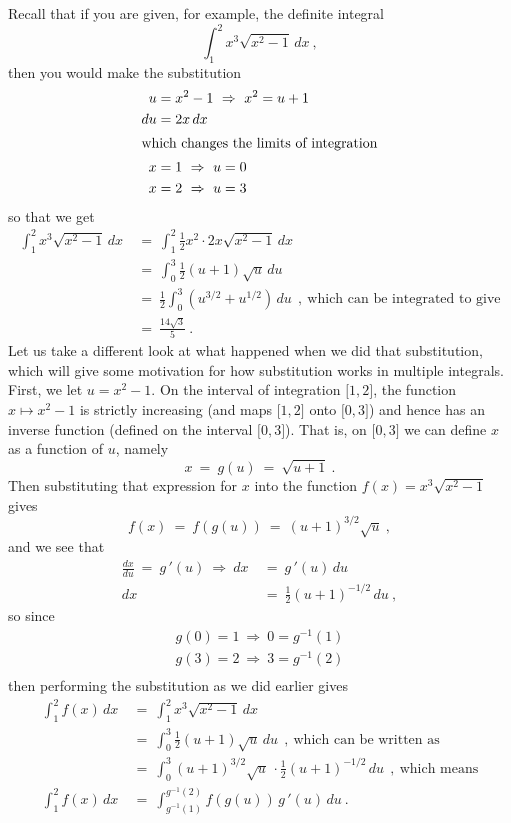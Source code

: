 Recall that if you are given, for example, the definite integral
\begin{displaymath}
 \int_1^2 x^3 \sqrt{x^2 - 1}\,dx ~,
\end{displaymath}
then you would make the substitution
\begin{align*}
u &= x^2 - 1 ~\Rightarrow~ x^2 = u + 1\\
du &= 2x\,dx\\
\intertext{which changes the limits of integration}
x &= 1 ~\Rightarrow~ u = 0\\
x &= 2 ~\Rightarrow~ u = 3
\end{align*}
so that we get
\begin{align*}
 \int_1^2 x^3 \sqrt{x^2 - 1}\,dx ~&=~ \int_1^2 \tfrac{1}{2}x^2 \cdot 2x \sqrt{x^2 - 1}\,dx\\
 &=~ \int_0^3 \tfrac{1}{2}(u+1)\sqrt{u}\,du\\
 &=~ \tfrac{1}{2} \int_0^3 \left( u^{3/2} + u^{1/2} \right)\,du ~~,~\text{which can be integrated to give}\\
 &=~ \tfrac{14\sqrt{3}}{5} ~.
\end{align*}
Let us take a different look at what happened when we did that substitution, which will give some motivation for how
substitution works in multiple integrals. First, we let $u = x^2 - 1$. On the interval of integration
$\lbrack 1,2 \rbrack$, the function $x \mapsto x^2 - 1$ is strictly increasing (and maps $\lbrack 1,2 \rbrack$ onto
$\lbrack 0,3 \rbrack$) and hence has an inverse function (defined on the interval $\lbrack 0,3 \rbrack$). That
is, on $\lbrack 0,3 \rbrack$ we can define $x$ as a function of $u$, namely
\begin{displaymath}
 x ~=~ g(u) ~=~ \sqrt{u+1} ~.
\end{displaymath}
Then substituting that expression for $x$ into the function $f(x) = x^3 \sqrt{x^2 - 1}$ gives
\begin{displaymath}
 f(x) ~=~ f(g(u)) ~=~ (u+1)^{3/2} \sqrt{u} ~,
\end{displaymath}
and we see that
\begin{align*}
 \frac{dx}{du} ~=~ g\,'(u) ~\Rightarrow~ dx ~&=~ g\,'(u)\,du\\
 dx ~&=~ \tfrac{1}{2} (u+1)^{-1/2}\,du ~,
\end{align*}
so since
\begin{align*}
 g(0) = 1 ~\Rightarrow~ 0 = g^{-1} (1)\\
 g(3) = 2 ~\Rightarrow~ 3 = g^{-1} (2)\\
\end{align*}
then performing the substitution as we did earlier gives
\begin{align*}
 \int_1^2 f(x)\,dx ~&=~ \int_1^2 x^3 \sqrt{x^2 - 1}\,dx\\
 &=~ \int_0^3 \tfrac{1}{2}(u+1)\sqrt{u}\,du ~~,~\text{which can be written as}\\
 &=~ \int_0^3 (u+1)^{3/2} \sqrt{u} \, \cdot \tfrac{1}{2} (u+1)^{-1/2}\,du ~~,~\text{which means}\\
 \int_1^2 f(x)\,dx ~&=~ \int_{g^{-1}(1)}^{g^{-1}(2)} f(g(u))\,g\,'(u)\,du ~.
\end{align*}

